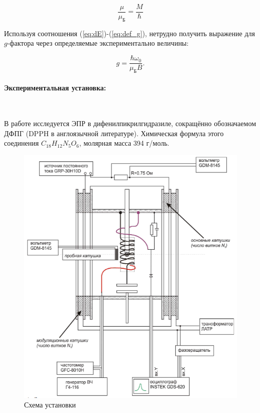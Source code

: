 \documentclass[a4paper, 12pt]{article}
\newcommand{\parag}[1]{\paragraph*{#1:}}
\begin{document}
\begin{equation}
    \label{eq:def_g}
    \frac{\mu}{\mu_Б} = \frac{M}{\hbar} 
\end{equation}

Используя соотношения (\ref{eq:dE})-(\ref{eq:def_g}), нетрудно получить выражение для $g$-фактора через определяемые экспериментально величины:

\begin{equation}
    \label{eq:g_is}
    \tag{$\star$}
    g = \frac{\hbar \omega_0}{\mu_Б B}.
\end{equation}

\parag {Экспериментальная установка} ~

В работе исследуется ЭПР в дифенилпикрилгидразиле,
сокращённо обозначаемом ДФПГ (DPPH в
англоязычной литературе). Химическая формула этого
соединения $C_{18} H_{12} N_5 O_6$, молярная масса 394 г/моль.

\begin{figure}[!h]
    \includegraphics[scale = 0.5]{Workplace}
    \centering
    \caption{Схема установки}
    \label{img:work}
\end{figure}

\newpage
\end{document}
